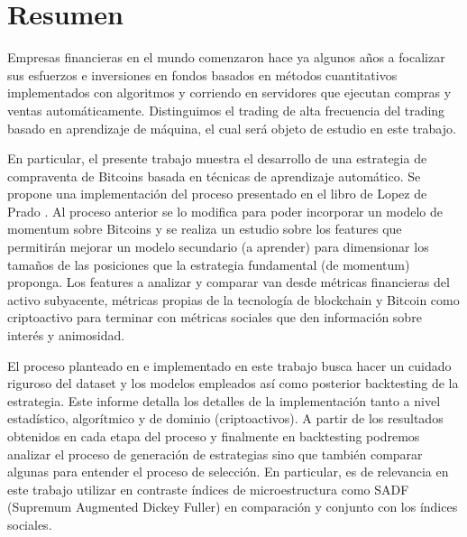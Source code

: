 \section{Resumen}
\label{sec:abstract_es}

Empresas financieras en el mundo comenzaron hace ya algunos años a focalizar sus esfuerzos e inversiones en fondos basados en métodos cuantitativos implementados con algoritmos y corriendo en servidores que ejecutan compras y ventas automáticamente. Distinguimos el trading de alta frecuencia del trading basado en aprendizaje de máquina, el cual será objeto de estudio en este trabajo.

En particular, el presente trabajo muestra el desarrollo de una estrategia de compraventa de Bitcoins basada en técnicas de aprendizaje automático. Se propone una implementación del proceso presentado en el libro de Lopez de Prado \cite{lopez_de_prado}. Al proceso anterior se lo modifica para poder incorporar un modelo de momentum sobre Bitcoins y se realiza un estudio sobre los features que permitirán mejorar un modelo secundario (a aprender) para dimensionar los tamaños de las posiciones que la estrategia fundamental (de momentum) proponga. Los features a analizar y comparar van desde métricas financieras del activo subyacente, métricas propias de la tecnología de blockchain y Bitcoin como criptoactivo para terminar con métricas sociales que den información sobre interés y animosidad.

El proceso planteado en \cite{lopez_de_prado} e implementado en este trabajo busca hacer un cuidado riguroso del dataset y los modelos empleados así como posterior backtesting de la estrategia. Este informe detalla los detalles de la implementación tanto a nivel estadístico, algorítmico y de dominio (criptoactivos). A partir de los resultados obtenidos en cada etapa del proceso y finalmente en backtesting podremos analizar el proceso de generación de estrategias sino que también comparar algunas para entender el proceso de selección. En particular, es de relevancia en este trabajo utilizar en contraste índices de microestructura como SADF (Supremum Augmented Dickey Fuller) en comparación y conjunto con los índices sociales.   
